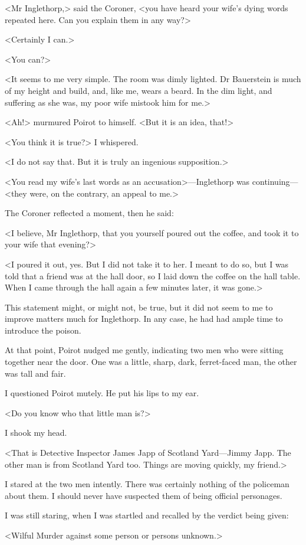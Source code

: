  <Mr Inglethorp,> said the Coroner, <you have heard your wife's dying words repeated here. Can you explain them in any way?> 

 <Certainly I can.> 

 <You can?> 

 <It seems to me very simple. The room was dimly lighted. Dr Bauerstein is much of my height and build, and, like me, wears a beard. In the dim light, and suffering as she was, my poor wife mistook him for me.> 

 <Ah!> murmured Poirot to himself. <But it is an idea, that!> 

 <You think it is true?> I whispered. 

 <I do not say that. But it is truly an ingenious supposition.> 

 <You read my wife's last words as an accusation>—Inglethorp was continuing—<they were, on the contrary, an appeal to me.> 

 The Coroner reflected a moment, then he said: 

 <I believe, Mr Inglethorp, that you yourself poured out the coffee, and took it to your wife that evening?> 

 <I poured it out, yes. But I did not take it to her. I meant to do so, but I was told that a friend was at the hall door, so I laid down the coffee on the hall table. When I came through the hall again a few minutes later, it was gone.> 

 This statement might, or might not, be true, but it did not seem to me to improve matters much for Inglethorp. In any case, he had had ample time to introduce the poison. 

 At that point, Poirot nudged me gently, indicating two men who were sitting together near the door. One was a little, sharp, dark, ferret-faced man, the other was tall and fair. 

 I questioned Poirot mutely. He put his lips to my ear. 

 <Do you know who that little man is?> 

 I shook my head. 

 <That is Detective Inspector James Japp of Scotland Yard—Jimmy Japp. The other man is from Scotland Yard too. Things are moving quickly, my friend.> 

 I stared at the two men intently. There was certainly nothing of the policeman about them. I should never have suspected them of being official personages. 

 I was still staring, when I was startled and recalled by the verdict being given: 

 <Wilful Murder against some person or persons unknown.>